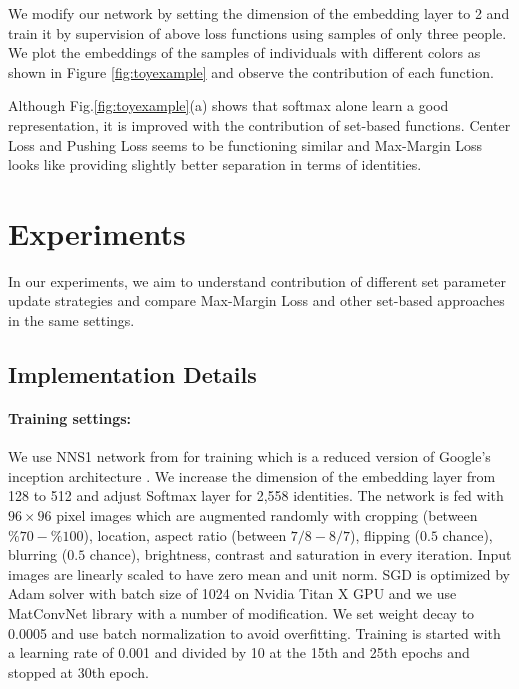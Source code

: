 \documentclass[10pt,twocolumn,letterpaper]{article}
\newcommand{\margin}{Max-Margin Loss\xspace}
\begin{document}
We modify our network by setting the dimension of the embedding layer to 2 and train it by supervision of above loss functions using samples of only three people. We plot the embeddings of the samples of individuals with different colors as shown in Figure \ref{fig:toyexample} and observe the contribution of each function. 

Although Fig.\ref{fig:toyexample}(a) shows that softmax alone learn a good representation, it is improved with the contribution of set-based functions. Center Loss and Pushing Loss seems to be functioning similar and \margin looks like providing slightly better separation in terms of identities.


\section{Experiments}

In our experiments, we aim to understand contribution of different set parameter update strategies and compare \margin and other set-based approaches in the same settings.

\subsection{Implementation Details}
\paragraph{Training settings:} We use NNS1 network from \cite{schroff2015facenet} for training which is a reduced version of Google's inception architecture \cite{szegedy2015going}. We increase the dimension of the embedding layer from 128 to 512 and adjust Softmax layer for 2,558 identities. The network is fed with $96 \times 96$ pixel images which are augmented randomly with cropping (between $\%70-\%100$), location, aspect ratio (between $7/8-8/7$), flipping ($0.5$ chance), blurring ($0.5$ chance), brightness, contrast and saturation in every iteration. Input images are linearly scaled to have zero mean and unit norm. SGD is optimized by Adam solver \cite{kingma2014adam} with batch size of 1024 on Nvidia Titan X GPU and we use MatConvNet library \cite{vedaldi2015matconvnet} with a number of modification. We set weight decay to 0.0005 and use batch normalization to avoid overfitting. Training is started with a learning rate of 0.001 and divided by 10 at the 15th and 25th epochs and stopped at 30th epoch.
\end{document}
